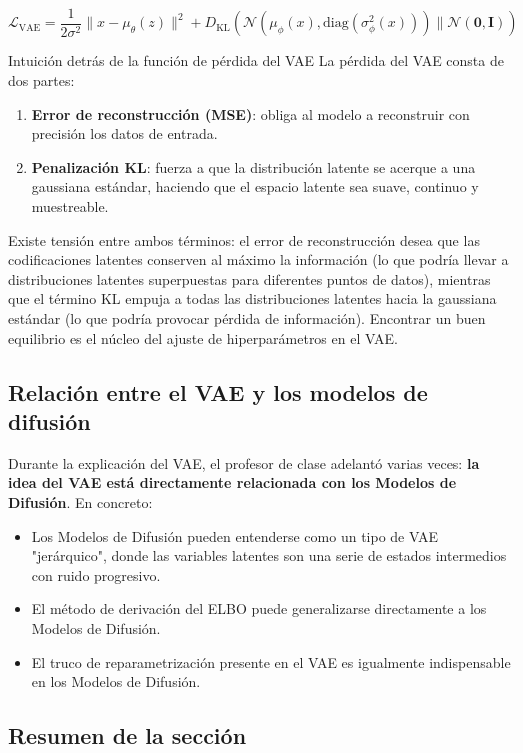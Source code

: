 $$\mathcal{L}_{\text{VAE}} = \frac{1}{2\sigma^2}\|x - \mu_\theta(z)\|^2 + D_{\mathrm{KL}}(\mathcal{N}(\mu_\phi(x), \text{diag}(\sigma^2_\phi(x))) \| \mathcal{N}(\mathbf{0}, \mathbf{I}))$$

\begin{importantbox}{Intuición detrás de la función de pérdida del VAE}
La pérdida del VAE consta de dos partes:
\begin{enumerate}
    \item \textbf{Error de reconstrucción (MSE)}: obliga al modelo a reconstruir con precisión los datos de entrada.
    \item \textbf{Penalización KL}: fuerza a que la distribución latente se acerque a una gaussiana estándar, haciendo que el espacio latente sea suave, continuo y muestreable.
\end{enumerate}
Existe tensión entre ambos términos: el error de reconstrucción desea que las codificaciones latentes conserven al máximo la información (lo que podría llevar a distribuciones latentes superpuestas para diferentes puntos de datos), mientras que el término KL empuja a todas las distribuciones latentes hacia la gaussiana estándar (lo que podría provocar pérdida de información). Encontrar un buen equilibrio es el núcleo del ajuste de hiperparámetros en el VAE.
\end{importantbox}

\subsection{Relación entre el VAE y los modelos de difusión}

Durante la explicación del VAE, el profesor de clase adelantó varias veces: \textbf{la idea del VAE está directamente relacionada con los Modelos de Difusión}. En concreto:

\begin{itemize}
    \item Los Modelos de Difusión pueden entenderse como un tipo de VAE "jerárquico", donde las variables latentes son una serie de estados intermedios con ruido progresivo.
    \item El método de derivación del ELBO puede generalizarse directamente a los Modelos de Difusión.
    \item El truco de reparametrización presente en el VAE es igualmente indispensable en los Modelos de Difusión.
\end{itemize}

\subsection{Resumen de la sección}

